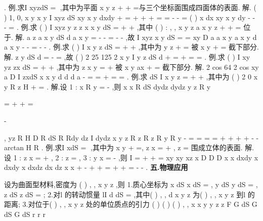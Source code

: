 \int \int 
. 
\textcolor{lyred}{例}.求I
xyzdS
\Sigma 
=\int \int 
,其中\Sigma 为平面
x
y
z
+
+
=与三个坐标面围成四面体的表面. 
解.
(
)
1,
0,
x y
x
y
I
xyz dS
xy
x
y
dxdy
\Sigma 
\Sigma 
\Sigma 
\Sigma 
\Sigma 
+\le 
\ge 
\ge 
=
+
+
+
=
\cdots 
=
-
-
\cdots 
=
\int \int 
\int \int 
\int \int 
\int \int 
\int \int 
\int \int 
(
)
x
dx
xy
x
y dy
-
-
-
=
\int 
\int 
. 
\textcolor{lyred}{例}.求
(
)
I
xyz y z
z x
x y
dS
\Sigma 
=
+
+
\int \int 
,其中
(
)
:
, ,
x
y
z
a
x y z
\sum 
+
+
=
\ge 
位于. 
解.
a
z
a
x
y
dS
d
a
x
y
\sigma 
=
-
-
\Rightarrow 
=
-
-
,故
I
xyz x y dS
\Sigma 
=
\cdots 
=
\int \int 
xy
D
a
a
x y
a
x
y
d
a
x
y
\sigma 
-
-
\cdots 
=
-
-
\int \int 
. 
\textcolor{lyred}{例}.求
(
)
I
x
y
z dS
\Sigma 
=
+
+
\int \int 
,其中\sum 为
y
z
+
=
被
x
y
+
=
截下部分. 
解.
z
y
dS
d\sigma 
=
-
\Rightarrow 
=
,故
(
)
2 25
125 2
x
y
I
y
z dS
d\sigma 
\pi 
\Sigma 
+
\le 
=
+
=
\cdots 
=
\int \int 
\int \int 
. 
\textcolor{lyred}{例}.求
(
)
I
xy
yz
zx dS
\Sigma 
=
+
+
\int \int 
,其中\Sigma 为
z
x
y
=
+
被
x
y
ax
+
=
截下部分. 
解.
2 cos
64 2
cos
xy
a
D
I
zxdS
x x
y
d
d
d
a
\pi 
\theta 
\pi 
\sigma 
\theta 
\rho 
\theta \rho 
\Sigma 
-
=
=
+
\cdots 
=
=
\int \int 
\int \int 
\int 
\int 
. 
\textcolor{lyred}{例}.求
dS
I
x
y
z
\Sigma 
=
+
+
\int \int 
,其中\Sigma 为
(
)
2 0
x
y
R
z
H
+
=
\le 
\le 
. 
解.设
1 : x
R
y
\Sigma 
=
-
,则
x
x
R
dS
dydz
dydz
y
z
R
y


\partial 
\partial 


=
+
+
=




\partial 
\partial 


-


, 
yz
R
H
D
R
dS
R
Rdy
dz
I
dydz
x
y
z
R
z
R
z
R
y
R
y
\Sigma 
-
=
=
\cdots 
=
\cdots 
=
+
+
+
+
-
-
\int \int 
\int \int 
\int 
{} arctan H
R
\pi 
. 
\textcolor{lyred}{例}.求I
xdS
\Sigma 
=\int \int 
,其中\Sigma 为
x
y
+
=,
z
x
=
+
,
z =
围成立体的表面. 
解.设
1 :
z
x
\Sigma 
=
+
,
2 :
z
\Sigma 
=
,
3 :
y
x
\Sigma 
=
-
,则
I
\Sigma 
\Sigma 
\Sigma 
=
+
+
=
\int \int 
\int \int 
\int \int 
xy
xy
xz
x
D
D
D
x
x
dxdy
x dxdy
x
dxdz
dx
dz
x
x
\pi 
+
-
\cdots 
+
\cdots 
+
\cdots 
=
+
+
=
-
-
\int \int 
\int \int 
\int \int 
\int 
\int 
. 
\vspace{4pt}
{\bfseries \textcolor{lyred}{五.物理应用}}

设\Sigma 为曲面型材料,密度为
(
)
, ,
x y z
\mu 
,则 
1.质心坐标为
x dS
x
dS
\mu 
\mu 
\Sigma 
\Sigma 
=\int \int 
\int \int 
,
y dS
y
dS
\mu 
\mu 
\Sigma 
\Sigma 
=\int \int 
\int \int 
,
z dS
z
dS
\mu 
\mu 
\Sigma 
\Sigma 
=\int \int 
\int \int 
; 
2.对l 的转动惯量
lI
d
dS
\mu 
\Sigma 
=\int \int 
,其中(
)
, ,
d x y z 为(
)
, ,
x y z 到l 的距离; 
3.对位于(
)
,
,
x
y
z
处的单位质点的引力 
(
)
(
)
(
)
,
,
x
x
y
y
z
z
F
G
dS G
dS G
dS
r
r
r
\mu 
\mu 
\mu 
\Sigma 
\Sigma 
\Sigma 


